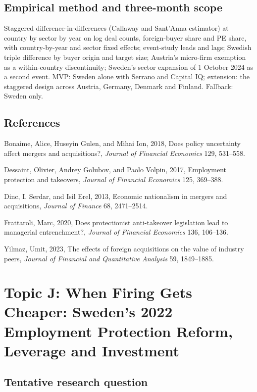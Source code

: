 \documentclass[12pt,a4paper]{article}
\newenvironment{refs}{\begin{list}{}{\setlength{\leftmargin}{1.5em}\setlength{\itemindent}{-1.5em}\setlength{\itemsep}{1pt}}}{\end{list}}
\begin{document}
\subsection{Empirical method and three-month scope}

Staggered difference-in-differences (Callaway and Sant'Anna estimator) at country by sector by year on log deal counts, foreign-buyer share and PE share, with country-by-year and sector fixed effects; event-study leads and lags; Swedish triple difference by buyer origin and target size; Austria's micro-firm exemption as a within-country discontinuity; Sweden's sector expansion of 1 October 2024 as a second event. MVP: Sweden alone with Serrano and Capital IQ; extension: the staggered design across Austria, Germany, Denmark and Finland. Fallback: Sweden only.

\subsection*{References}
\begin{refs}
\item Bonaime, Alice, Huseyin Gulen, and Mihai Ion, 2018, Does policy uncertainty affect mergers and acquisitions?, \emph{Journal of Financial Economics} 129, 531--558.
\item Dessaint, Olivier, Andrey Golubov, and Paolo Volpin, 2017, Employment protection and takeovers, \emph{Journal of Financial Economics} 125, 369--388.
\item Dinc, I. Serdar, and Isil Erel, 2013, Economic nationalism in mergers and acquisitions, \emph{Journal of Finance} 68, 2471--2514.
\item Frattaroli, Marc, 2020, Does protectionist anti-takeover legislation lead to managerial entrenchment?, \emph{Journal of Financial Economics} 136, 106--136.
\item Yilmaz, Umit, 2023, The effects of foreign acquisitions on the value of industry peers, \emph{Journal of Financial and Quantitative Analysis} 59, 1849--1885.
\end{refs}

\newpage

\section{Topic J: When Firing Gets Cheaper: Sweden's 2022 Employment Protection Reform, Leverage and Investment}

\subsection{Tentative research question}
\end{document}
